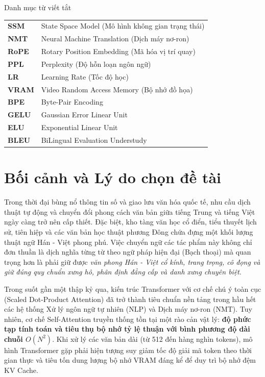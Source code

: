 \documentclass{uetgraduation}
\begin{document}
\begin{contentlisting}
\tableofcontents
\listoffigures
\listoftables

\begin{contentlistingsection}{Danh mục từ viết tắt}
\begin{tabular}{ll}
\textbf{SSM} & State Space Model (Mô hình không gian trạng thái)\\
\textbf{NMT} & Neural Machine Translation (Dịch máy nơ-ron)\\
\textbf{RoPE} & Rotary Position Embedding (Mã hóa vị trí quay)\\
\textbf{PPL} & Perplexity (Độ hỗn loạn ngôn ngữ)\\
\textbf{LR} & Learning Rate (Tốc độ học)\\
\textbf{VRAM} & Video Random Access Memory (Bộ nhớ đồ họa)\\
\textbf{BPE} & Byte-Pair Encoding\\
\textbf{GELU} & Gaussian Error Linear Unit\\
\textbf{ELU} & Exponential Linear Unit\\
\textbf{BLEU} & BiLingual Evaluation Understudy\\
\end{tabular}
\end{contentlistingsection}
\end{contentlisting}

\section{Bối cảnh và Lý do chọn đề tài}
Trong thời đại bùng nổ thông tin số và giao lưu văn hóa quốc tế, nhu cầu dịch thuật tự động và chuyển đổi phong cách văn bản giữa tiếng Trung và tiếng Việt ngày càng trở nên cấp thiết. Đặc biệt, kho tàng văn học cổ điển, tiểu thuyết lịch sử, tiên hiệp và các văn bản học thuật phương Đông chứa đựng một khối lượng thuật ngữ Hán - Việt phong phú. Việc chuyển ngữ các tác phẩm này không chỉ đơn thuần là dịch nghĩa từng từ theo ngữ pháp hiện đại (Bạch thoại) mà quan trọng hơn là phải giữ được \textit{văn phong Hán - Việt cổ kính, trang trọng, cô đọng và giữ đúng quy chuẩn xưng hô, phân định đẳng cấp và danh xưng chuyên biệt}.

Trong suốt gần một thập kỷ qua, kiến trúc Transformer với cơ chế chú ý toàn cục (Scaled Dot-Product Attention) đã trở thành tiêu chuẩn nền tảng trong hầu hết các hệ thống Xử lý ngôn ngữ tự nhiên (NLP) và Dịch máy nơ-ron (NMT). Tuy nhiên, cơ chế Self-Attention truyền thống tồn tại một rào cản vật lý: \textbf{độ phức tạp tính toán và tiêu thụ bộ nhớ tỷ lệ thuận với bình phương độ dài chuỗi $O(N^2)$}. Khi xử lý các văn bản dài (từ 512 đến hàng nghìn tokens), mô hình Transformer gặp phải hiện tượng suy giảm tốc độ giải mã token theo thời gian thực và tiêu tốn dung lượng bộ nhớ VRAM đáng kể để duy trì bộ nhớ đệm KV Cache.
\end{document}
